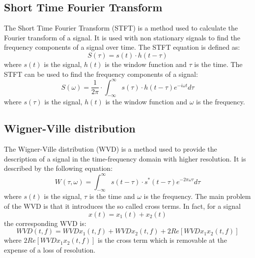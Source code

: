 \documentclass[a4paper]{sapthesis}
\begin{document}
\subsection{Short Time Fourier Transform}\label{sec:stft}
The Short Time Fourier Transform (STFT)\cite{stft}\cite{stft2}
is a method used to calculate the
Fourier transform of a signal. It is used with non stationary signals
to find the frequency components of a signal over time.
The STFT equation is defined as:
\begin{equation}
\label{eq:stft}
S(\tau) = s(t) \cdot h(t-\tau)
\end{equation}
where $s(t)$ is the signal, $h(t)$ is the window function and $\tau$ is
the time. \newline
The STFT can be used to find the frequency components of a signal:
\begin{equation}
\label{eq:stft2}
S(\omega)= \frac{1}{2\pi}\cdot \int_{-\infty}^{\infty} s(\tau) \cdot h(t-\tau) e^{-i\omega t} d\tau
\end{equation}
where $s(\tau)$ is the signal, $h(t)$ is the window function and $\omega$
is the frequency. \newline

\subsection{Wigner-Ville distribution}\label{sec:wvd}
The Wigner-Ville distribution (WVD)\cite{wvd} is a method used to provide
the description of a signal in the time-frequency domain with higher resolution.
It is described by the following equation:
\begin{equation}
\label{eq:wvd}
W(\tau, \omega) = \int_{-\infty}^{\infty} s(t-\tau) \cdot s^*(t-\tau) e^{-2\pi\omega \tau} d\tau
\end{equation}
where $s(t)$ is the signal, $\tau$ is the time and $\omega$ is the frequency.
The main problem of the WVD is that it introduces the so called cross terms.
In fact, for a signal
\begin{equation} x(t)=x_1(t)+x_2(t)
\end{equation}
the corresponding WVD is:
\begin{equation}
WVD(t,f)= WVDx_1(t,f) + WVDx_2(t,f) + 2Re[WVDx_1x_2(t,f)]
\end{equation}
where $2Re[WVDx_1x_2(t,f)]$ is the cross term
which is removable at the expense of a loss of resolution.  \newline
\end{document}
